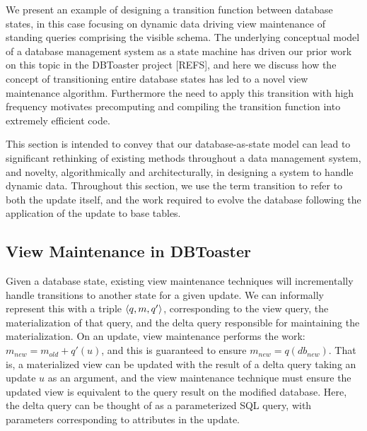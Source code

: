 We present an example of designing a transition function between database
states, in this case focusing on dynamic data driving view maintenance of
standing queries comprising the visible schema. The underlying conceptual model
of a database management system as a state machine has driven our prior work on
this topic in the DBToaster project [REFS], and here we discuss how the concept
of transitioning entire database states has led to a novel view maintenance
algorithm. Furthermore the need to apply this transition with high frequency
motivates precomputing and compiling the transition function into extremely
efficient code.

This section is intended to convey that our database-as-state model can lead to
significant rethinking of existing methods throughout a data management system,
and novelty, algorithmically and architecturally, in designing a system to
handle dynamic data. Throughout this section, we use the term transition to
refer to both the update itself, and the work required to evolve the database
following the application of the update to base tables.

\vspace{1mm}
\subsection{View Maintenance in DBToaster}
Given a database state, existing view maintenance techniques will incrementally
handle transitions to another state for a given update. We can informally
represent this with a triple ${\langle q,m,q'\rangle}$, corresponding to the view query,
the materialization of that query, and the delta query responsible for
maintaining the materialization.
On an update, view maintenance performs the work: $m_{new} = m_{old} + q'(u)$,
and this is guaranteed to ensure $m_{new} = q(db_{new})$. That is, a
materialized view can be updated with the result of a delta query taking an
update $u$ as an argument, and the view maintenance technique must ensure the
updated view is equivalent to the query result on the modified database. Here,
the delta query can be thought of as a parameterized SQL query, with parameters
corresponding to attributes in the update.

